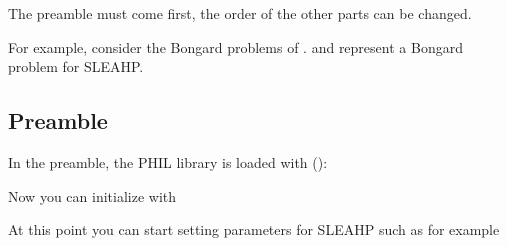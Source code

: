\documentclass[letterpaper,10pt,english]{sphinxmanual}
\begin{document}
The preamble must come first, the order of the other parts can be changed.

For example, consider the Bongard problems of \label{\detokenize{index:id13}}{\hyperref[\detokenize{index:raelae95-alt95}]{\sphinxcrossref{{[}DRVL95{]}}}}.  and  represent a Bongard problem for SLEAHP.


\subsection{Preamble}
\label{\detokenize{index:preamble}}
In the preamble, the PHIL library is loaded with ():

%
\begin{sphinxVerbatim}[commandchars=\\\{\}]
 
\end{sphinxVerbatim}

Now you can initialize  with

%
\begin{sphinxVerbatim}[commandchars=\\\{\}]
 
\end{sphinxVerbatim}

At this point you can start setting parameters for SLEAHP such as for example

%
\begin{sphinxVerbatim}[commandchars=\\\{\}]
 
 
 
 
 
\end{sphinxVerbatim}
\end{document}
